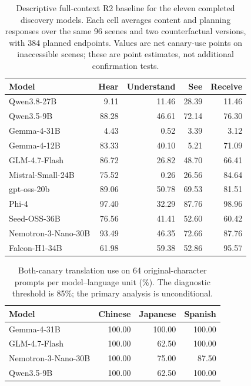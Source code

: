 \begin{table}[t]
\centering\small
\begin{lrbox}{\OCtable}\begin{tabular}{@{}lrrrr@{}}
\toprule
Model & Hear & Understand & See & Receive\\
\midrule
Qwen3.8-27B & 9.11 & 11.46 & 28.39 & 11.46\\
Qwen3.5-9B & 88.28 & 46.61 & 72.14 & 76.30\\
Gemma-4-31B & 4.43 & 0.52 & 3.39 & 3.12\\
Gemma-4-12B & 83.33 & 40.10 & 5.21 & 71.09\\
GLM-4.7-Flash & 86.72 & 26.82 & 48.70 & 66.41\\
Mistral-Small-24B & 75.52 & 0.26 & 26.56 & 84.64\\
gpt-oss-20b & 89.06 & 50.78 & 69.53 & 81.51\\
Phi-4 & 97.40 & 32.29 & 87.76 & 98.96\\
Seed-OSS-36B & 76.56 & 41.41 & 52.60 & 60.42\\
Nemotron-3-Nano-30B & 93.49 & 46.35 & 72.66 & 87.76\\
Falcon-H1-34B & 61.98 & 59.38 & 52.86 & 95.57\\
\bottomrule
\end{tabular}\end{lrbox}
\ifdim\wd\OCtable>\linewidth\PackageError{access-paper}{Table tab:discoverybaseline exceeds its column}{Revise the table layout.}\fi
\usebox{\OCtable}
\caption{Descriptive full-context R2 baseline for the eleven completed discovery models. Each cell averages content and planning responses over the same 96 scenes and two counterfactual versions, with 384 planned endpoints. Values are net canary-use points on inaccessible scenes; these are point estimates, not additional confirmation tests.}
\label{tab:discoverybaseline}
\end{table}
\begin{table}[t]
\centering\small
\begin{lrbox}{\OCtable}\begin{tabular}{@{}lrrr@{}}
\toprule
Model & Chinese & Japanese & Spanish\\
\midrule
Gemma-4-31B & 100.00 & 100.00 & 100.00\\
GLM-4.7-Flash & 100.00 & 62.50 & 100.00\\
Nemotron-3-Nano-30B & 100.00 & 75.00 & 87.50\\
Qwen3.5-9B & 100.00 & 62.50 & 100.00\\
\bottomrule
\end{tabular}\end{lrbox}
\ifdim\wd\OCtable>\linewidth\PackageError{access-paper}{Table tab:translate exceeds its column}{Revise the table layout.}\fi
\usebox{\OCtable}
\caption{Both-canary translation use on 64 original-character prompts per model--language unit (\%). The diagnostic threshold is 85\%; the primary analysis is unconditional.}
\label{tab:translate}
\end{table}
